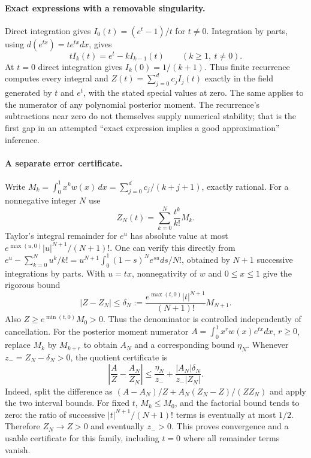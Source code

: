 \documentclass[11pt]{article}
\begin{document}
\paragraph{Exact expressions with a removable singularity.}
Direct integration gives $I_0(t)=(e^t-1)/t$ for $t\ne0$.
Integration by parts, using $d(e^{tx})=te^{tx}dx$, gives
\[
 t I_k(t)=e^t-k I_{k-1}(t)\qquad(k\ge1,\ t\ne0).
\]
At $t=0$ direct integration gives $I_k(0)=1/(k+1)$.
Thus finite recurrence computes every integral and
$Z(t)=\sum_{j=0}^d c_jI_j(t)$ exactly in the field generated by
$t$ and $e^t$, with the stated special values at zero. The same applies
to the numerator of any polynomial posterior moment. The recurrence's
subtractions near zero do not themselves supply numerical stability;
that is the first gap in an attempted ``exact expression implies a good
approximation'' inference.

\paragraph{A separate error certificate.}
Write
$M_k=\int_0^1x^kw(x)\,dx=\sum_{j=0}^d c_j/(k+j+1)$, exactly rational.
For a nonnegative integer $N$ use
\[
 Z_N(t)=\sum_{k=0}^N\frac{t^k}{k!}M_k.
\]
Taylor's integral remainder for $e^u$ has absolute value at most
$e^{\max(u,0)}|u|^{N+1}/(N+1)!$. One can verify this directly from
$e^u-\sum_{k=0}^Nu^k/k!=u^{N+1}\int_0^1(1-s)^Ne^{su}ds/N!$,
obtained by $N+1$ successive integrations by parts. With $u=tx$,
nonnegativity of $w$ and $0\le x\le1$ give the rigorous bound
\[
 |Z-Z_N|\le\delta_N:=
 \frac{e^{\max(t,0)}|t|^{N+1}}{(N+1)!}M_{N+1}.
\]
Also $Z\ge e^{\min(t,0)}M_0>0$. Thus the denominator is controlled
independently of cancellation. For the posterior moment numerator
$A=\int_0^1x^r w(x)e^{tx}dx$, $r\ge0$, replace $M_k$ by $M_{k+r}$
to obtain $A_N$ and a corresponding bound $\eta_N$.
Whenever $z_-=Z_N-\delta_N>0$, the quotient certificate is
\[
\left|\frac A Z-\frac{A_N}{Z_N}\right|
\le \frac{\eta_N}{z_-}
 +\frac{|A_N|\delta_N}{z_-|Z_N|}.
\]
Indeed, split the difference as $(A-A_N)/Z+
A_N(Z_N-Z)/(ZZ_N)$ and apply the two interval bounds.
For fixed $t$, $M_k\le M_0$, and the factorial bound tends to zero:
the ratio of successive $|t|^{N+1}/(N+1)!$ terms is eventually at most
$1/2$. Therefore $Z_N\to Z>0$ and eventually $z_->0$.
This proves convergence and a usable certificate for this family,
including $t=0$ where all remainder terms vanish.
\end{document}
